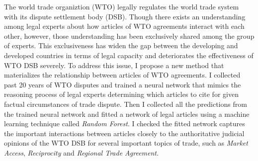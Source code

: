 The world trade organiztion (WTO) legally regulates the world trade system with its dispute settlement body (DSB).
Though there exists an understanding among legal experts about how articles of WTO agreements interact with each other, %
however, those understanding has been exclusively shared among the group of experts.  %
This exclusiveness has widen the gap
between the developing and developed countries in terms of
legal capacity and deteriorates the effectiveness of WTO DSB severely.
To address this issue, I propose a new method that materializes the relationship between articles of WTO agreements. %
I collected past 20 years of WTO disputes and trained a neural network that mimics the reasoning process of legal experts determining which articles to cite for given factual circumstances of trade dispute.
Then I collected all the predictions from the trained neural network and fitted a network of legal articles using a machine learning technique called \textit{Random Forest}.
I checked the fitted network captures the important interactions between articles closely to the authoritative judicial opinions of the WTO DSB for several important topics of trade, such as \textit{Market Access}, \textit{Reciprocity} and \textit{Regional Trade Agreement}.
















